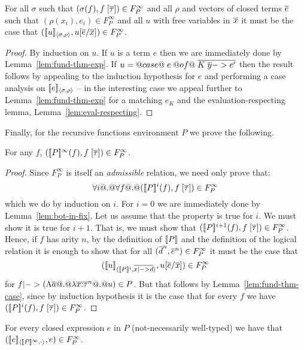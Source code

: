 \documentclass[preprint,nocopyrightspace,draft]{sigplanconf}
\begin{document}
\begin{lemma}\label{lem:fund-thm-case}
For all $\sigma$ such that $(\sigma(f),f\;[\overline{\tau}]) \in F_P^\infty$ and 
all $\rho$ and vectors of closed terms $\overline{e}$ such that $(\rho(x_i),e_i) \in F_P^\infty$ 
and all $u$ with free variables in $\overline{x}$ it must be the case 
that $([\![u]\!]_{\langle {\sigma},{\rho}\rangle},u[\overline{e}/\overline{x}]) \in F_P^\infty$.
\end{lemma}
\begin{proof} By induction on $u$. If $u$ is a term $e$ then we are immediately done
by Lemma~\ref{lem:fund-thm-exp}. If $u = @case@\;e\;@of@\;\overline{K\;\overline{y} -> e'}$ then the 
result follows by appealing to the induction hypothesis for $e$ and performing a case 
analysis on $[\![e]\!]_{\langle {\sigma},{\rho}\rangle}$ -- in the interesting case we appeal further to
Lemma~\ref{lem:fund-thm-exp} for a matching $e_K$ and the evaluation-respecting lemma, 
Lemma~\ref{lem:eval-respecting}.
\end{proof}

Finally, for the recursive functions environment $P$ we prove the following.
\begin{lemma} For any $f$, $([\![P]\!]^\infty(f),f\;[\overline{\tau}]) \in F_P^\infty$. \end{lemma}
\begin{proof}
Since $F_P^\infty$ is itself an {\em admissible} relation, we need only prove that:
\[ \forall i @.@ \forall f @.@ ([\![P]\!]^i(f),f\;[\overline{\tau}]) \in F_P^\infty \] 
which we do by induction on $i$. For $i = 0$ we are immediately done by Lemma~\ref{lem:bot-in-fix}.
Let us assume that the property is true for $i$. We must show it is true for $i+1$. That is, 
we must show that $([\![P]\!]^{i+1}(f),f\;[\overline{\tau}]) \in F_P^\infty$. Hence, if $f$ has arity $n$, by
the definition of $[\![P]\!]$ and the definition of the logical relation it is enough to show that
for all $(\overline{d}^{n},\overline{e}^{n}) \in F_P^\infty$ it must be the case that 
\[    ([\![u]\!]_{\langle {[\![P]\!]^i},{\overline{x |-> d}}\rangle}, u[\overline{e}/\overline{x}]) \in F_P^\infty \] 
for $f |-> (\Lambda\overline{a} @.@ \lambda\overline{x{:}\tau}^{n} @.@ u) \in P$. But that follows by 
Lemma~\ref{lem:fund-thm-case}, since by induction hypothesis it is the case that for 
every $f$ we have $([\![P]\!]^i(f),f\;[\overline{\tau}]) \in F_P^\infty$.
\end{proof} 

\begin{corollary}\label{cor:fund-thm-top}
For every closed expression $e$ in $P$ (not-necessarily well-typed) we have that 
$([\![e]\!]_{\langle {[\![P]\!]^\infty},{\cdot}\rangle}, e) \in F_P^\infty$. 
\end{corollary}
\end{document}
